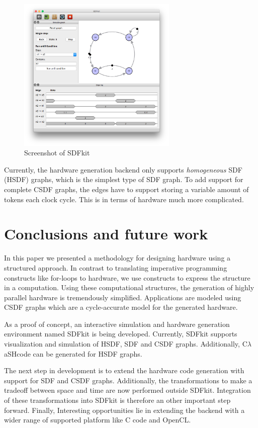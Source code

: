 \documentclass[journal]{IEEEtran}
\newcommand{\clash}{C$\lambda$aSH}
\begin{document}
  \begin{figure}[h!]
    \centering
    \includegraphics[width=3in]{screenshot.png}
    \caption{Screenshot of SDFkit}
    \label{fig:screenshot}
  \end{figure}

  Currently, the hardware generation backend only supports \emph{homogeneous} SDF (HSDF) graphs, which is the simplest type of SDF graph.
  To add support for complete CSDF graphs, the edges have to support storing a variable amount of tokens each clock cycle.
  This is in terms of hardware much more complicated.

\section{Conclusions and future work}
\label{sec:conclusions}

  In this paper we presented a methodology for designing hardware using a structured approach.
  In contrast to translating imperative programming constructs like for-loops to hardware, we use constructs to express the structure in a computation.
  Using these computational structures, the generation of highly parallel hardware is tremendously simplified.
  Applications are modeled using CSDF graphs which are a cycle-accurate model for the generated hardware.

  As a proof of concept, an interactive simulation and hardware generation environment named SDFkit is being developed.
  Currently, SDFkit supports visualization and simulation of HSDF, SDF and CSDF graphs.
  Additionally, \clash code can be generated for HSDF graphs.

  The next step in development is to extend the hardware code generation with support for SDF and CSDF graphs.
  Additionally, the transformations to make a tradeoff between space and time are now performed outside SDFkit.
  Integration of these transformations into SDFkit is therefore an other important step forward.
  Finally, Interesting opportunities lie in extending the backend with a wider range of supported platform like C code and OpenCL.
  
\end{document}

